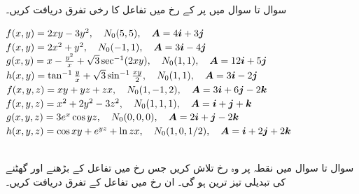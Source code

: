 \\
سوال  تا سوال  میں  پر  کے رخ  میں تفاعل کا رخی تفرق دریافت کریں۔

$f(x,y)=2xy-3y^2,\quad N_0(5,5),\quad \kvec{A}=4\ai+3\aj$
$f(x,y)=2x^2+y^2,\quad N_0(-1,1),\quad \kvec{A}=3\ai-4\aj$
$g(x,y)=x-\frac{y^2}{x}+\sqrt{3}\sec^{-1}(2xy),\quad N_0(1,1),\quad \kvec{A}=12\ai+5\aj$
$h(x,y)=\tan^{-1}\frac{y}{x}+\sqrt{3}\sin^{-1}\frac{xy}{2},\quad N_0(1,1),\quad \kvec{A}=3\ai-2\aj$
$f(x,y,z)=xy+yz+zx,\quad N_0(1,-1,2),\quad \kvec{A}=3\ai+6\aj-2\ak$
$f(x,y,z)=x^2+2y^2-3z^2,\quad N_0(1,1,1),\quad \kvec{A}=\ai+\aj+\ak$
$g(x,y,z)=3e^x\cos yz,\quad N_0(0,0,0),\quad \kvec{A}=2\ai+\aj-2\ak$
$h(x,y,z)=\cos xy+e^{yz}+\ln zx,\quad N_0(1,0,1/2),\quad \kvec{A}=\ai+2\aj+2\ak$

\\
سوال  تا سوال  میں نقطہ   پر  وہ رخ تلاش کریں جس رخ میں  تفاعل کے بڑھنے اور گھٹنے کی تبدیلی تیز ترین ہو گی۔ ان رخ  میں تفاعل کے تفرق دریافت کریں۔

